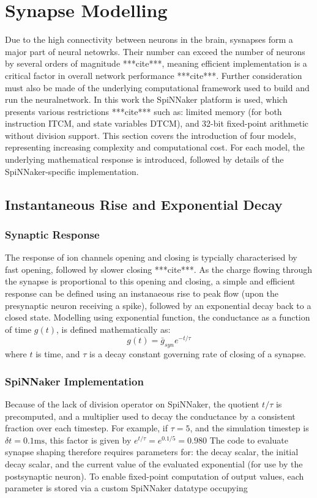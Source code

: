 \documentclass[12pt]{article}
\begin{document}
\section{Synapse Modelling}
Due to the high connectivity between neurons in the brain, sysnapses form a
major part of neural netowrks. Their number can exceed the number of neurons by
several orders of magnitude ***cite***, meaning efficient implementation is a
critical factor in overall network performance ***cite***. Further consideration
must also be made of the underlying computational framework used to build and
run the neuralnetwork. In this work the SpiNNaker platform is used, which
presents various restrictions ***cite*** such as: limited memory (for both
instruction ITCM, and state variables DTCM), and 32-bit fixed-point arithmetic
without division support. This section covers the introduction of four models,
representing increasing complexity and computational cost. For each model, the
underlying mathematical response is introduced, followed by details of the
SpiNNaker-specific implementation.

\subsection{Instantaneous Rise and Exponential Decay}
\subsubsection*{Synaptic Response}
The response of ion channels opening and closing is typcially characterised by
fast opening, followed by slower closing ***cite***. As the charge flowing
through the synapse is proportional to this opening and closing, a simple and
efficient response can be defined using an instanaeous rise to peak flow (upon
the presynaptic neuron receiving a spike), followed by an exponential decay
back to a closed state. Modelling using exponential function, the conductance
as a function of time $g(t)$, is defined mathematically as:
\begin{equation}
g(t) = \bar{g}_{syn} e^{-t/\tau}
\end{equation}
where $t$ is time, and $\tau$ is a decay constant governing rate of closing of a
synapse.

\subsubsection*{SpiNNaker Implementation}
Because of the lack of division operator on SpiNNaker, the quotient $t/\tau$ is
precomputed, and a multiplier used to decay the conductance by a consistent
fraction over each timestep. For example, if $\tau = 5$, and the simulation
timestep is $\delta t = 0.1 \mathrm{ms}$, this factor is given by $e^{t/\tau} =
e^{0.1/5} = 0.980$
The code to evaluate synapse shaping therefore requires parameters for: the
decay scalar, the initial decay scalar, and the current value of the evaluated
exponential (for use by the postsynaptic neuron). To enable fixed-point
computation of output values, each parameter is stored via a custom SpiNNaker
datatype occupying
\end{document}
